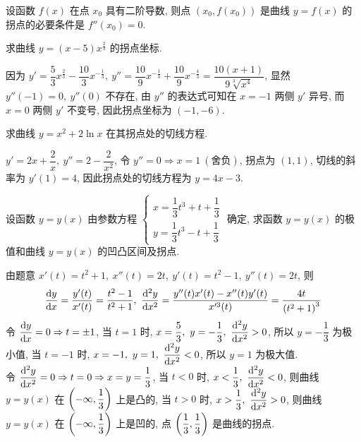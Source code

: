 \begin{theorem}[拐点存在的必要条件]
    设函数 $f(x)$ 在点 $x_0$ 具有二阶导数, 则点 $(x_0,f(x_0))$ 是曲线 $y=f(x)$ 的拐点的必要条件是 $f''(x_0)=0.$
\end{theorem}

\begin{example}[2008 数二]
    求曲线 $y=(x-5)x^{\frac{2}{3}}$ 的拐点坐标.
\end{example}
\begin{solution}
    因为 $y'=\dfrac{5}{3}x^{\frac{2}{3}}-\dfrac{10}{3}x^{-\frac{1}{3}},~y''=\dfrac{10}{9}x^{-\frac{1}{3}}+\dfrac{10}{9}x^{-\frac{4}{3}}=\dfrac{10(x+1)}{9\sqrt[3]{x^4}}$, 显然 $y''(-1)=0,~y''(0)$ 不存在, 由 $y''$ 的表达式可知在 $x=-1$ 两侧 $y'$ 异号, 而 $x=0$ 两侧 $y'$ 不变号, 因此拐点坐标为 $(-1,-6).$
\end{solution}

\begin{example}[2018 数二]
    求曲线 $y=x^2+2\ln x$ 在其拐点处的切线方程.
\end{example}
\begin{solution}
    $y'=2x+\dfrac{2}{x},~y''=2-\dfrac{2}{x^2}$, 令 $y''=0\Rightarrow x=1~(\text{舍负})$, 拐点为 $(1,1)$, 切线的斜率为 $y'(1)=4$, 因此拐点处的切线方程为 $y=4x-3.$
\end{solution}

\begin{example}[2011 数二]
    设函数 $y=y(x)$ 由参数方程 $\begin{cases}
        x=\dfrac{1}{3}t^3+t+\dfrac{1}{3}\\[6pt]
        y=\dfrac{1}{3}t^3-t+\dfrac{1}{3}
    \end{cases}$ 确定, 求函数 $y=y(x)$ 的极值和曲线 $y=y(x)$ 的凹凸区间及拐点.
\end{example}
\begin{solution}
    由题意 $x'(t)=t^2+1,~x''(t)=2t,~y'(t)=t^2-1,~y''(t)=2t$, 则 
    $$\dv{y}{x}=\dfrac{y'(t)}{x'(t)}=\dfrac{t^2-1}{t^2+1},~\dv[2]{y}{x}=\dfrac{y''(t)x'(t)-x''(t)y'(t)}{x'^3(t)}=\dfrac{4t}{\qty(t^2+1)^3}$$
    令 $\displaystyle\dv{y}{x}=0\Rightarrow t=\pm 1$, 当 $t=1$ 时, $\displaystyle x=\dfrac{5}{3},~y=-\dfrac{1}{3},~\dv[2]{y}{x}>0$, 所以 $y=-\dfrac{1}{3}$ 为极小值, 
    当 $t=-1$ 时, $x=-1,~y=1,~\displaystyle\dv[2]{y}{x}<0$, 所以 $y=1$ 为极大值.\\
    令 $\displaystyle\dv[2]{y}{x}=0\Rightarrow t=0\Rightarrow x=y=\dfrac{1}{3}$, 当 $t<0$ 时, $x<\dfrac{1}{3},~\displaystyle \dv[2]{y}{x}<0$, 则曲线 $y=y(x)$ 在 $\qty(-\infty,\dfrac{1}{3})$ 上是凸的, 
    当 $t>0$ 时, $x>\dfrac{1}{3},~\displaystyle\dv[2]{y}{x}>0$, 则曲线 $y=y(x)$ 在 $\qty(-\infty,\dfrac{1}{3})$ 上是凹的, 点 $\qty(\dfrac{1}{3},\dfrac{1}{3})$ 是曲线的拐点.
\end{solution}

